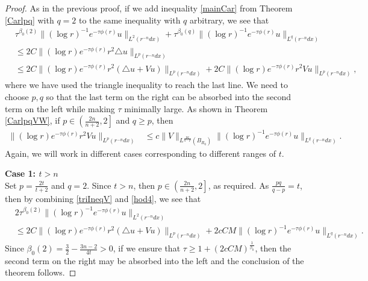 \documentclass[11pt]{amsart}
\theoremstyle{plain}
\numberwithin{equation}{section}
\begin{document}
\begin{proof}
As in the previous proof, if we add inequality \eqref{mainCar} from Theorem \ref{Carlpq} with $q = 2$ to the same inequality with $q$ arbitrary, we see that
\begin{align}
&\tau^{{\beta}_0{\left( {2} \right) }} \|(\log r)^{-1} e^{-\tau \phi(r)}u\|_{L^2(r^{-n}dx)}
+\tau^{{\beta}_0{\left( {q} \right) }} \|(\log r)^{-1} e^{-\tau \phi(r)}u\|_{L^q(r^{-n}dx)} \nonumber \\
&\leq 2 C \|(\log r ) e^{-\tau \phi(r)} r^2 \triangle u\|_{L^p(r^{-n} dx)}  \nonumber \\
&\le 2 C\|(\log r) e^{-\tau \phi(r)} r^2 (\triangle u + V u)\|_{L^p(r^{-n} dx)}
+ 2 C\|(\log r) e^{-\tau \phi(r)} r^2 V u \|_{L^p(r^{-n} dx)},
\label{triIneqV}
\end{align}
where we have used the triangle inequality to reach the last line.
We need to choose $p, q$ so that the last term on the right can be absorbed into the second term on the left while making $\tau$ minimally large.
As shown in Theorem \ref{CarlpqVW}, if $p \in {\left( {\frac{2n}{n+2}, 2} \right] }$ and $q \ge p$, then
\begin{align}
\|(\log r) e^{-\tau \phi(r)} r^2 V u \|_{L^p(r^{-n} dx)}
&\le c \|V\|_{L^{\frac{pq}{q-p}}{\left( {B_{R_0}} \right) }} \|(\log r)^{-1} e^{-\tau \phi(r)} u\|_{L^q(r^{-n} dx)}.
\label{hod4}
\end{align}
Again, we will work in different cases corresponding to different ranges of $t$.

{\bf Case 1: $t > n$} \\
Set $p = \frac{2t}{t+2}$ and $q = 2$.
Since $t > n$, then $p \in \left(\frac{2n}{n+2}, 2\right]$, as required.
As $\frac{pq}{q-p} = t$, then by combining \eqref{triIneqV} and \eqref{hod4}, we see that
\begin{align*}
&2\tau^{{\beta}_0{\left( {2} \right) }} \|(\log r)^{-1} e^{-\tau \phi(r)}u\|_{L^2(r^{-n}dx)}
 \nonumber \\
&\le 2 C\|(\log r) e^{-\tau \phi(r)} r^2 (\triangle u + V u)\|_{L^p(r^{-n} dx)}
+ 2 c C M \|(\log r)^{-1}e^{-\tau \phi(r)} u\|_{L^q(r^{-n}dx)}.
\end{align*}
Since ${\beta}_0{\left( {2} \right) } = \frac 3 2 - \frac{3n-2}{4t} > 0$, if we ensure that $\tau \ge 1 + {\left( {2 c C M} \right) }^{\frac 1 {{\beta}_0}}$, then the second term on the right may be absorbed into the left and the conclusion of the theorem follows.


\end{proof}
\end{document}
